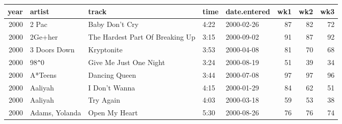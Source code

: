 \begin{tabular}{rllllrrr}
  \toprule
 year & artist & track & time & date.entered & wk1 & wk2 & wk3 \\ 
  \midrule
  2000 & 2 Pac & Baby Don't Cry & 4:22 & 2000-02-26 &  87 &  82 &  72 \\ 
  2000 & 2Ge+her & The Hardest Part Of Breaking Up & 3:15 & 2000-09-02 &  91 &  87 &  92 \\ 
  2000 & 3 Doors Down & Kryptonite & 3:53 & 2000-04-08 &  81 &  70 &  68 \\ 
  2000 & 98\verb|^|0 & Give Me Just One Night & 3:24 & 2000-08-19 &  51 &  39 &  34 \\ 
  2000 & A*Teens & Dancing Queen & 3:44 & 2000-07-08 &  97 &  97 &  96 \\ 
  2000 & Aaliyah & I Don't Wanna & 4:15 & 2000-01-29 &  84 &  62 &  51 \\ 
  2000 & Aaliyah & Try Again & 4:03 & 2000-03-18 &  59 &  53 &  38 \\ 
  2000 & Adams, Yolanda & Open My Heart & 5:30 & 2000-08-26 &  76 &  76 &  74 \\ 
   \bottomrule
\end{tabular}
